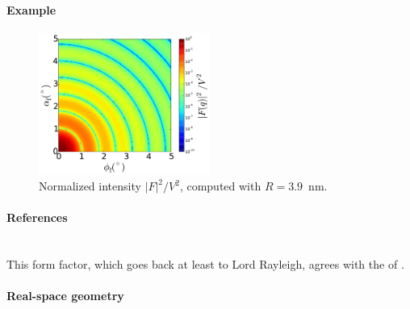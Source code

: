 \paragraph{Example}\nopagebreak\strut\nopagebreak

\begin{figure}[H]
\begin{center}
\includegraphics[width=0.5\textwidth]{fig/ff2/ff_FullSphere.pdf}
\end{center}
\caption{Normalized intensity $|F|^2/V^2$,
computed with $R=3.9$~nm.}
\end{figure}

\paragraph{References}\strut\\
This form factor, which goes back at least to Lord Rayleigh,
agrees with the  of \IsGISAXS
\cite[Eq.~2.36]{Laz08} \cite[Eq.~226]{ReLL09}.


 \label{SHemiEllipsoid}

\paragraph{Real-space geometry}\strut\\

